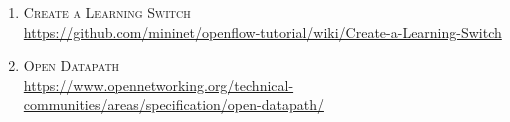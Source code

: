 	\begin{enumerate}
		\item \textsc{Create a Learning Switch}\\
		\href{https://github.com/mininet/openflow-tutorial/wiki/Create-a-Learning-Switch}
		{https://github.com/mininet/openflow-tutorial/wiki/Create-a-Learning-Switch}
		\item \textsc{Open Datapath}\\
		\href{https://www.opennetworking.org/technical-communities/areas/specification/open-datapath/}
		{https://www.opennetworking.org/technical-communities/areas/specification/open-datapath/}
	\end{enumerate}
